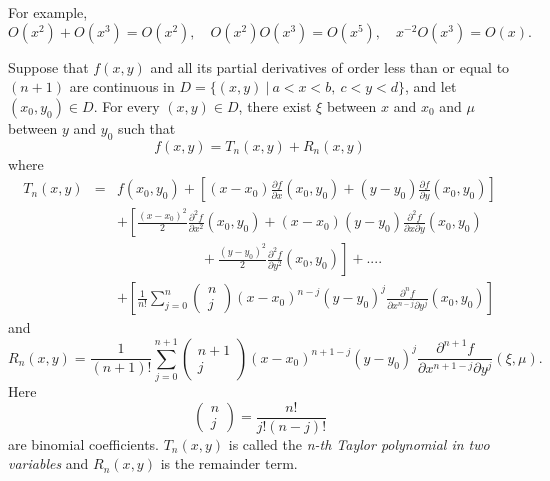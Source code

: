 \noindent
For example,
\[
O(x^2)+O(x^3)=O(x^2), \quad
O(x^2)O(x^3)=O(x^5), \quad
x^{-2}O(x^3)=O(x).
\]

\pagebreak[2]

\begin{theorem}
Suppose that $f(x, y)$ and all its partial derivatives of order less
than or equal to $(n+1)$ are continuous in
$D=\{ (x, y) \ \vert \ a< x< b, \ c< y< d \}$, and let $(x_{0}, y_{0})\in D$.
For every $(x, y)\in D$, there exist $\xi$ between $x$ and $x_{0}$ and $\mu$
between $y$ and $y_{0}$ such that
$$
f(x, y)=T_{n}(x, y)+R_{n}(x, y)
$$
where
\begin{eqnarray}
T_{n}(x, y) &=& f(x_{0}, y_{0})+
\left[(x-x_{0})\frac{\partial f}{\partial x}(x_{0}, y_{0})+
(y-y_{0})\frac{\partial f}{\partial y}(x_{0}, y_{0})\right] \nonumber \\
&& + \left[\frac{(x-x_{0})^{2}}{2}\frac{\partial^{2} f}{\partial x^{2}}(x_{0}, y_{0})+
(x-x_{0})(y-y_{0})\frac{\partial^{2} f}{\partial x\partial y}(x_{0}, y_{0})\right.\\
&&\qquad\qquad\qquad+\left.
\frac{(y-y_{0})^{2}}{2}\frac{\partial^{2} f}{\partial y^{2}}(x_{0}, y_{0})
\right] + .... \nonumber \\
&& + \left[\frac{1}{n!}\sum_{j=0}^{n}
\left(
\begin{array}{c}
n \\
 j
\end{array}
\right)
(x-x_{0})^{n-j}(y-y_{0})^{j}
\frac{\partial^{n} f}{\partial x^{n-j}\partial y^{j}}(x_{0}, y_{0})\right] \nonumber
\end{eqnarray}
and
\[
R_{n}(x, y)=
\frac{1}{(n+1)!}\sum_{j=0}^{n+1}
\left(
\begin{array}{c}
n+1 \\
 j
\end{array}
\right)
(x-x_{0})^{n+1-j}(y-y_{0})^{j}
\frac{\partial^{n+1} f}{\partial x^{n+1-j}\partial y^{j}}(\xi, \mu) .
\]
Here
\[
\left(
\begin{array}{c}
n \\
 j
\end{array}
\right)=\frac{n!}{j!(n-j)!}
\]
are binomial coefficients.
$T_{n}(x, y)$ is called the {\it n-th Taylor polynomial in
two variables} and $R_{n}(x, y)$ is the remainder term.
\end{theorem}
